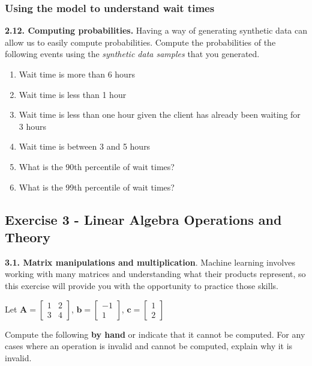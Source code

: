 \documentclass[
  letterpaper,
  DIV=11,
  numbers=noendperiod]{scrartcl}
\providecommand{\tightlist}{%
  \setlength{\itemsep}{0pt}\setlength{\parskip}{0pt}}\usepackage{longtable,booktabs,array}
\begin{document}
\subsubsection{Using the model to understand wait
times}\label{using-the-model-to-understand-wait-times}

\textbf{2.12. Computing probabilities.} Having a way of generating
synthetic data can allow us to easily compute probabilities. Compute the
probabilities of the following events using the \emph{synthetic data
samples} that you generated.

\begin{enumerate}
\def\labelenumi{\arabic{enumi}.}
\tightlist
\item
  Wait time is more than 6 hours
\item
  Wait time is less than 1 hour
\item
  Wait time is less than one hour given the client has already been
  waiting for 3 hours
\item
  Wait time is between 3 and 5 hours
\item
  What is the 90th percentile of wait times?
\item
  What is the 99th percentile of wait times?
\end{enumerate}

\newpage{}

\subsection{Exercise 3 - Linear Algebra Operations and
Theory}\label{exercise-3---linear-algebra-operations-and-theory}

\textbf{3.1. Matrix manipulations and multiplication}. Machine learning
involves working with many matrices and understanding what their
products represent, so this exercise will provide you with the
opportunity to practice those skills.

Let \(\mathbf{A} =  \begin{bmatrix}
1 & 2 \\
3 & 4
\end{bmatrix}\), \(\mathbf{b} =  \begin{bmatrix}
-1  \\
1
\end{bmatrix}\), \(\mathbf{c} =  \begin{bmatrix}
1  \\
2
\end{bmatrix}\)

Compute the following \textbf{by hand} or indicate that it cannot be
computed. For any cases where an operation is invalid and cannot be
computed, explain why it is invalid.
\end{document}

